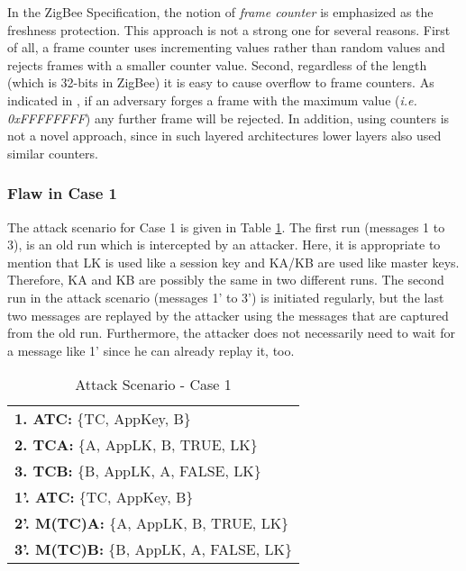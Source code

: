 In the ZigBee Specification, the notion of \emph{frame counter} is emphasized as the freshness protection. 
This approach is not a strong one for several reasons.
First of all, a frame counter uses incrementing values rather than random values and rejects frames with a smaller counter value.
Second, regardless of the length (which is 32-bits in ZigBee) it is easy to cause overflow to frame counters. As indicated in \cite{Sastry:Wagner}, if an adversary forges a frame with the maximum value (\emph{i.e. 0xFFFFFFFF}) any further frame will be rejected.
In addition, using counters is not a novel approach, since in such layered architectures lower layers also used similar counters.

\subsubsection{Flaw in Case 1}
The attack scenario for Case 1 is given in Table \ref{tab:att1}. The first run (messages 1 to 3), is an old run which is intercepted by an attacker. Here, it is appropriate to mention that LK is used like a session key and KA/KB are used like master keys. Therefore, KA and KB are possibly the same in two different runs. The second run in the attack scenario (messages 1' to 3') is initiated regularly, but the last two messages are replayed by the attacker using the messages that are captured from the old run.
Furthermore, the attacker does not necessarily need to wait for a message like 1' since he can already replay it, too.

\begin{table}\caption{Attack Scenario - Case 1}
\label{tab:att1}
\centering
\begin{tabular}{l}
\hline
\textbf{1. ATC:}      \{TC, AppKey, B\}   \\
\textbf{2. TCA:}      \{A, AppLK, B, TRUE, LK\}  \\
\textbf{3. TCB:}      \{B, AppLK, A, FALSE, LK\}  \\
\hline
\textbf{1'. ATC:}     \{TC, AppKey, B\}   \\
\textbf{2'. M(TC)A:}  \{A, AppLK, B, TRUE, LK\}  \\
\textbf{3'. M(TC)B:}  \{B, AppLK, A, FALSE, LK\}  \\
\hline
\end{tabular}
\end{table}

